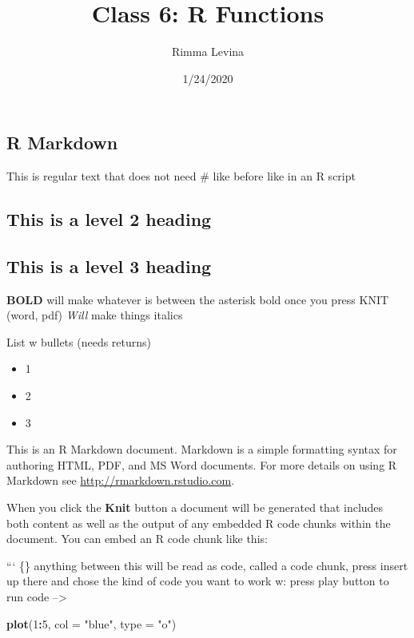 \documentclass[]{article}
\title{Class 6: R Functions}
\author{Rimma Levina}
\date{1/24/2020}
\newenvironment{Shaded}{\begin{snugshade}}{\end{snugshade}}
\newcommand{\DataTypeTok}[1]{\textcolor[rgb]{0.13,0.29,0.53}{#1}}
\newcommand{\DecValTok}[1]{\textcolor[rgb]{0.00,0.00,0.81}{#1}}
\newcommand{\KeywordTok}[1]{\textcolor[rgb]{0.13,0.29,0.53}{\textbf{#1}}}
\newcommand{\NormalTok}[1]{#1}
\newcommand{\OperatorTok}[1]{\textcolor[rgb]{0.81,0.36,0.00}{\textbf{#1}}}
\newcommand{\StringTok}[1]{\textcolor[rgb]{0.31,0.60,0.02}{#1}}
\providecommand{\tightlist}{%
  \setlength{\itemsep}{0pt}\setlength{\parskip}{0pt}}
\begin{document}
\maketitle

\hypertarget{r-markdown}{%
\subsection{R Markdown}\label{r-markdown}}

This is regular text that does not need \# like before like in an R
script

\hypertarget{this-is-a-level-2-heading}{%
\subsection{This is a level 2 heading}\label{this-is-a-level-2-heading}}

\hypertarget{this-is-a-level-3-heading}{%
\subsection{This is a level 3 heading}\label{this-is-a-level-3-heading}}

\textbf{BOLD} will make whatever is between the asterisk bold once you
press KNIT (word, pdf) \emph{Will} make things italics

List w bullets (needs returns)

\begin{itemize}
\tightlist
\item
  1
\item
  2
\item
  3
\end{itemize}

This is an R Markdown document. Markdown is a simple formatting syntax
for authoring HTML, PDF, and MS Word documents. For more details on
using R Markdown see \url{http://rmarkdown.rstudio.com}.

When you click the \textbf{Knit} button a document will be generated
that includes both content as well as the output of any embedded R code
chunks within the document. You can embed an R code chunk like this:

``` \{\} anything between this will be read as code, called a code
chunk, press insert up there and chose the kind of code you want to work
w: press play button to run code --\textgreater{}

\begin{Shaded}
\begin{Highlighting}[]
\KeywordTok{plot}\NormalTok{(}\DecValTok{1}\OperatorTok{:}\DecValTok{5}\NormalTok{, }\DataTypeTok{col =} \StringTok{"blue"}\NormalTok{, }\DataTypeTok{type =} \StringTok{"o"}\NormalTok{)}
\end{Highlighting}
\end{Shaded}
\end{document}
